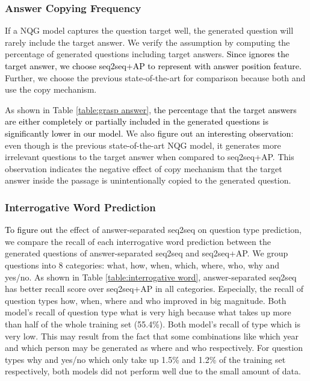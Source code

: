 \documentclass[letterpaper]{article} %
\newcommand{\hh}[1]{\textcolor{black}{#1}}
\begin{document}
\subsubsection{Answer Copying Frequency}
If a NQG model captures the question target well, the generated question will rarely include the target answer. We verify the assumption by computing the percentage of generated questions including target answers. \hh{Since \cite{du2017learning} ignores the target answer, we choose seq2seq+AP to represent \cite{du2017learning} with answer position feature. } Further, we choose the previous state-of-the-art \cite{song2018leveraging} for comparison because both \cite{zhou2017neural} and \cite{song2018leveraging} use the copy mechanism.

As shown in Table \ref{table:grasp answer}, \hh{the percentage that the target answers are either completely or partially included in the generated questions is significantly lower in our model.} We also \hh{figure out an interesting observation}: even though \cite{song2018leveraging} is the previous state-of-the-art NQG model, it generates more irrelevant questions to the target answer when compared to seq2seq+AP. This observation indicates the negative effect of copy mechanism that the target answer inside the passage is unintentionally copied to the generated question.



\subsubsection{Interrogative Word Prediction}
\hh{To figure out} the effect of answer-separated seq2seq on question type prediction, we compare the recall of each interrogative word prediction between the generated questions of answer-separated seq2seq and seq2seq+AP. We group questions into 8 categories: what, how, when, which, where, who, why and yes/no. As shown in Table \ref{table:interrogative word}, answer-separated seq2seq has better recall score over seq2seq+AP in all categories. Especially, the recall of question types how, when, where and who improved in big magnitude. Both model's recall of question type what is very high because what takes up more than half of the whole training set (55.4\%). Both model's recall of type which is very low. This may result from the fact that some combinations like which year and which person may be generated as where and who respectively. For question types why and yes/no which only take up 1.5\% and 1.2\% of the training set respectively, both models did not perform well due to the small amount of data.
\end{document}
